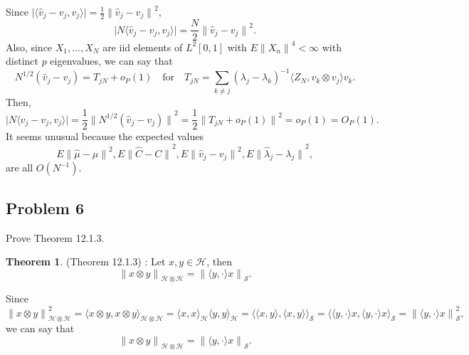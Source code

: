 \documentclass{article}
\theoremstyle{definition}
\newtheorem{theorem}{Theorem}[section]
\numberwithin{equation}{section}
\begin{document}
\begin{mysol}
Since $\vert \langle \hat{v}_{j} - v_{j}, v_{j} \rangle \vert = \frac{1}{2}{\lVert \hat{v}_{j} - v_{j} \rVert}^{2},$
$$
\vert N \langle \hat{v}_{j} - v_{j}, v_{j} \rangle \vert = \frac{N}{2}{\lVert \hat{v}_{j} - v_{j} \rVert}^{2}.
$$
Also, since $X_{1}, \ldots, X_{N}$ are iid elements of $L^{2}[0,1]$ with $E{\lVert X_{n} \rVert}^{4} < \infty$ with distinct $p$ eigenvalues, we can say that
$$
N^{1/2}(\hat{v}_{j} - v_{j}) = T_{jN} + o_{P}(1) \quad \text{for} \quad T_{jN} = \sum_{k \neq j}{(\lambda_{j} - \lambda_{k} )}^{-1} \langle Z_{N}, v_{k} \otimes v_{j} \rangle v_{k}.
$$
Then, 
$$
\vert N \langle \hat{v}_{j} - v_{j}, v_{j} \rangle \vert 
= \frac{1}{2} { \lVert N^{1/2} ( \hat{v}_{j} - v_{j} )\rVert}^{2}
= \frac{1}{2} { \lVert T_{jN} + o_{P}(1) \rVert}^{2}
= o_{P}(1)
= O_{P}(1).
$$
It seems unusual because the expected values $$E {\lVert \hat{\mu} - \mu \rVert}^{2}, 
E {\lVert \hat{C} - C \rVert}^{2}, E {\lVert \hat{v}_{j} - v_{j} \rVert}^{2}, E {\lVert \hat{\lambda}_{j} - \lambda_{j} \rVert}^{2},$$
are all $O(N^{-1})$.


\end{mysol}

\subsection{Problem 6}

\begin{problem}
Prove Theorem 12.1.3.

\begin{theorem}
(Theorem 12.1.3) : 
Let $x, y \in \mathcal{H}$, then
$$
{\lVert x \otimes y \rVert}_{\mathcal{H} \otimes \mathcal{H}} = {\lVert \langle y, \cdot \rangle x \rVert}_{\mathcal{S}}.
$$
\end{theorem}

\end{problem}

\begin{mysol}
Since 
$$
{\lVert x \otimes y \rVert}_{\mathcal{H} \otimes \mathcal{H}}^{2}
= {\langle x \otimes y , x \otimes y\rangle}_{\mathcal{H} \otimes \mathcal{H}}
= {\langle x, x \rangle}_{\mathcal{H}} {\langle y, y \rangle}_{\mathcal{H}}
= {\langle \langle x, y \rangle, \langle x, y \rangle \rangle}_{\mathcal{S}}
= {\langle \langle y, \cdot \rangle x, \langle y, \cdot \rangle x \rangle}_{\mathcal{S}}
= {\lVert \langle y, \cdot \rangle x \rVert}_{\mathcal{S}}^{2},
$$
we can say that
$$
{\lVert x \otimes y \rVert}_{\mathcal{H} \otimes \mathcal{H}} =  {\lVert \langle y, \cdot \rangle x \rVert}_{\mathcal{S}}.
$$

\end{mysol}
\end{document}
